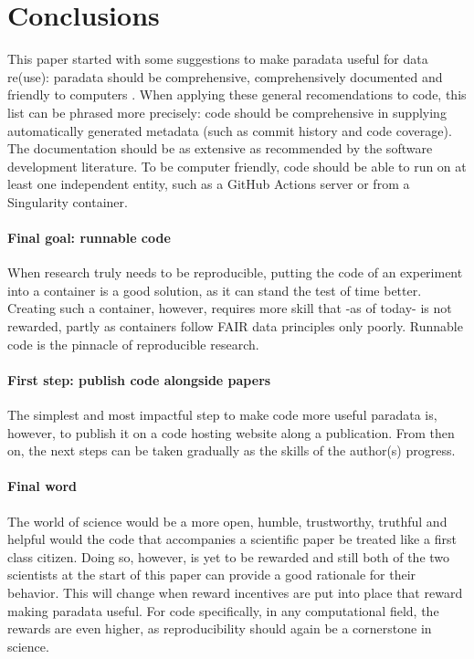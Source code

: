 \section{Conclusions}

This paper started with some suggestions to 
make paradata useful for data re(use):
paradata should be comprehensive, comprehensively documented
and friendly to computers \cite{huvila2022improving}.
When applying these general recomendations to code, 
this list can be phrased more precisely:
code should be comprehensive in supplying 
automatically generated metadata (such as commit history and code coverage).
The documentation should be as extensive as recommended by the 
software development literature. To be computer friendly,
code should be able to run on at least one independent entity,
such as a GitHub Actions server or from a Singularity container.

\paragraph{Final goal: runnable code}

When research truly needs to be reproducible, putting the code 
of an experiment into a container is a good solution, as it 
can stand the test of time better.
Creating such a container, however, requires more skill
that -as of today- is not rewarded,
partly as containers follow FAIR data principles only poorly.
Runnable code is the pinnacle of reproducible research.

\paragraph{First step: publish code alongside papers}

The simplest and most impactful step to make code more useful paradata
is, however, to publish it on a code hosting website 
along a publication. From then on, the next steps can be taken 
gradually as the skills of the author(s) progress.

\paragraph{Final word}

The world of science would be a more open, humble, trustworthy, truthful
and helpful would the code that accompanies a scientific paper
be treated like a first class citizen. 
Doing so, however, is yet to be rewarded
and still both of the two scientists at the start of this paper 
can provide a good rationale for their behavior.
This will change when reward incentives are put into place 
that reward making paradata useful.
For code specifically, in any computational field,
the rewards are even higher, as reproducibility should again be 
a cornerstone in science.

